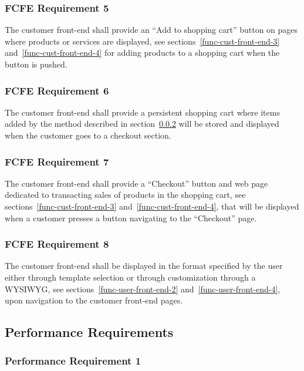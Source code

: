 \documentclass{article}
\begin{document}
\subsubsection{FCFE Requirement 5}
\label{func-cust-front-end-5}

The customer front-end shall provide an ``Add to shopping cart'' button on pages
where products or services are displayed, see
sections~\ref{func-cust-front-end-3} and~\ref{func-cust-front-end-4} for adding
products to a shopping cart when the button is pushed.

\subsubsection{FCFE Requirement 6}
\label{func-cust-front-end-6}

The customer front-end shall provide a persistent shopping cart where items
added by the method described in section~\ref{func-cust-front-end-6} will be
stored and displayed when the customer goes to a checkout section.

\subsubsection{FCFE Requirement 7}
\label{func-cust-front-end-7}

The customer front-end shall provide a ``Checkout'' button and web page
dedicated to transacting sales of products in the shopping cart, see
sections~\ref{func-cust-front-end-3} and~\ref{func-cust-front-end-4}, that
will be displayed when a customer presses a button navigating to the ``Checkout''
page.

\subsubsection{FCFE Requirement 8}
\label{func-cust-front-end-8}

The customer front-end shall be displayed in the format specified by the user
either through template selection or through customization through a WYSIWYG,
see sections~\ref{func-user-front-end-2} and~\ref{func-user-front-end-4}, upon
navigation to the customer front-end pages.

\pagebreak
\subsection{Performance Requirements}

\subsubsection{Performance Requirement 1}
\label{perf-back-end-1}
\end{document}
